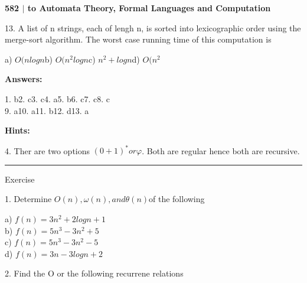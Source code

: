 \documentclass[a4paper]{article}
\begin{document}
\vspace{5mm}
\begin{flushleft}
\textbf{582 $\vert$ to Automata Theory, Formal Languages and Computation}
\end{flushleft}
\begin{flushleft}
13. A list of n strings, each of lengh n, is sorted into lexicographic order using the merge-sort algorithm. The worst case running time of this computation is\\ 
\end{flushleft}
a) $O(n log n$\hspace{1cm}b) $O(n^2 log n$\hspace{1cm}c) $n^2 + log n$\hspace{1cm}d) $O(n^2$\\
\begin{flushleft}
\textbf{Answers:}
\end{flushleft}
1. b\hspace{1cm}2. c\hspace{1cm}3. c\hspace{1cm}4. a\hspace{1cm}5. b\hspace{1cm}6. c\hspace{1cm}7. c\hspace{1cm}8. c\\
9. a\hspace{1cm}10. a\hspace{1cm}11. b\hspace{1cm}12. d\hspace{1cm}13. a\\
\begin{flushleft}
\textbf{Hints:}
\end{flushleft}
4. Ther are two options $(0+1)^* or \varphi$. Both are regular hence both are recursive.\\
\hrule\begin{center}
Exercise
\end{center}
\begin{flushleft}
1. Determine $O(n), \omega(n), and \theta(n)$of the following\\
\end{flushleft}
a) $f(n)=3n^2+2log n+1$\\
b) $f(n)=5n^3-3n^2+5$\\
c) $f(n)=5n^3-3n^2-5$\\
d) $f(n)=3n-3log n+2$\\
\begin{flushleft}
2. Find the O or the following recurrene relations\\
\end{flushleft}
\end{document}
